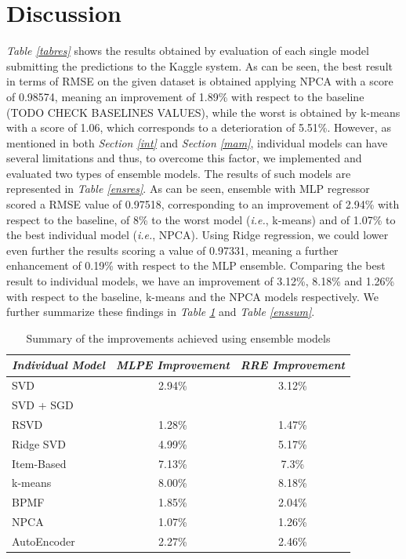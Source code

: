 \documentclass[10pt,conference,compsocconf]{IEEEtran}
\begin{document}
\section{Discussion}
\label{disc}

\emph{Table \ref{tabres}} shows the results obtained by evaluation of each single model submitting the predictions to the Kaggle system. As can be seen, the best result in terms of RMSE on the given dataset is obtained applying NPCA with a score of 0.98574, meaning an improvement of 1.89\% with respect to the baseline (TODO CHECK BASELINES VALUES), while the worst is obtained by k-means with a score of 1.06, which corresponds to a deterioration of 5.51\%. However, as mentioned in both \emph{Section \ref{int}} and \emph{Section \ref{mam}}, individual models can have several limitations and thus, to overcome this factor, we implemented and evaluated two types of ensemble models. The results of such models are represented in \emph{Table \ref{ensres}}. As can be seen, ensemble with MLP regressor scored a RMSE value of 0.97518, corresponding to an improvement of 2.94\% with respect to the baseline, of 8\% to the worst model (\emph{i.e.}, k-means) and of 1.07\% to the best individual model (\emph{i.e.}, NPCA). Using Ridge regression, we could lower even further the results scoring a value of 0.97331, meaning a further enhancement of 0.19\% with respect to the MLP ensemble. Comparing the best result to individual models, we have an improvement of 3.12\%, 8.18\% and 1.26\% with respect to the baseline, k-means and the NPCA models respectively. We further summarize these findings in \emph{Table \ref{sumtab}} and \emph{Table \ref{enssum}}.

\begin{table}[h!] 
	\centering
	\begin{tabular}{l|c|c}
		\textit{\textbf{Individual Model}} & \textit{\textbf{MLPE Improvement}} & \textit{\textbf{RRE Improvement}} \\
		\hline
		SVD                     &       2.94\%     &     3.12\%         \\
		SVD + SGD               &                 &      				 \\
		RSVD       	            &        1.28\%  &     1.47\%         		\\
		Ridge SVD               &        4.99\%   &    5.17\%         		\\
		Item-Based              &        7.13\%     &   7.3\%        		\\
		k-means                 &        8.00\%     &  8.18\%         		\\
		BPMF                    &        1.85\%  &     2.04\%        \\
		NPCA                    &        1.07\%   &    1.26\%   				\\
		AutoEncoder             &        2.27\%    &   2.46\%        
	\end{tabular}
    \caption{Summary of the improvements achieved using ensemble models}
    \label{sumtab}
\end{table}
\end{document}

